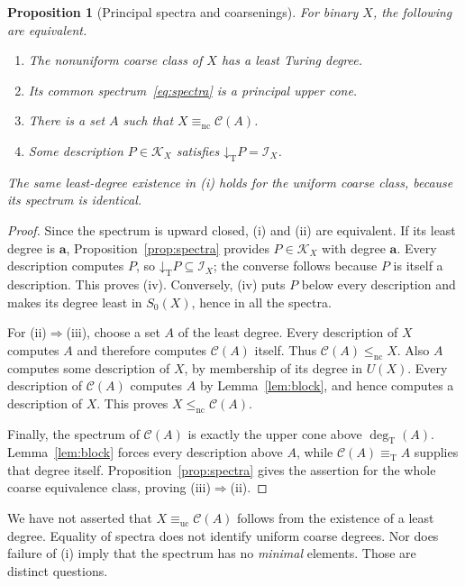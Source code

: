 \documentclass[11pt,a4paper]{article}
\newcommand{\eqT}{\equiv_{\mathrm T}}
\newcommand{\lenc}{\leq_{\mathrm{nc}}}
\newcommand{\eqnc}{\equiv_{\mathrm{nc}}}
\newcommand{\equc}{\equiv_{\mathrm{uc}}}
\newcommand{\degT}{\operatorname{deg}_{\mathrm T}}
\newcommand{\Core}{\mathcal I}
\newcommand{\low}[1]{\mathord{\downarrow}_{\mathrm T}#1}
\newtheorem{proposition}[theorem]{Proposition}
\theoremstyle{definition}\newtheorem{definition}[theorem]{Definition}
\theoremstyle{remark}\newtheorem{remark}[theorem]{Remark}
\begin{document}
\begin{proposition}[Principal spectra and coarsenings]\label{prop:criterion}
For binary $X$, the following are equivalent.
\begin{enumerate}[label=(\roman*)]
\item The nonuniform coarse class of $X$ has a least Turing degree.
\item Its common spectrum~\eqref{eq:spectra} is a principal upper cone.
\item There is a set $A$ such that $X\eqnc\mathcal C(A)$.
\item Some description $P\in\mathcal K_X$ satisfies $\low P=\Core_X$.
\end{enumerate}
The same least-degree existence in (i) holds for the uniform coarse class, because its spectrum is identical.
\end{proposition}
\begin{proof}
Since the spectrum is upward closed, (i) and (ii) are equivalent. If its least degree is $\mathbf a$, Proposition~\ref{prop:spectra} provides $P\in\mathcal K_X$ with degree $\mathbf a$. Every description computes $P$, so $\low P\subseteq\Core_X$; the converse follows because $P$ is itself a description. This proves (iv). Conversely, (iv) puts $P$ below every description and makes its degree least in $S_0(X)$, hence in all the spectra.

For (ii)$\Rightarrow$(iii), choose a set $A$ of the least degree. Every description of $X$ computes $A$ and therefore computes $\mathcal C(A)$ itself. Thus $\mathcal C(A)\lenc X$. Also $A$ computes some description of $X$, by membership of its degree in $U(X)$. Every description of $\mathcal C(A)$ computes $A$ by Lemma~\ref{lem:block}, and hence computes a description of $X$. This proves $X\lenc\mathcal C(A)$.

Finally, the spectrum of $\mathcal C(A)$ is exactly the upper cone above $\degT(A)$. Lemma~\ref{lem:block} forces every description above $A$, while $\mathcal C(A)\eqT A$ supplies that degree itself. Proposition~\ref{prop:spectra} gives the assertion for the whole coarse equivalence class, proving (iii)$\Rightarrow$(ii).
\end{proof}

We have not asserted that $X\equc\mathcal C(A)$ follows from the existence of a least degree. Equality of spectra does not identify uniform coarse degrees. Nor does failure of (i) imply that the spectrum has no \emph{minimal} elements. Those are distinct questions.
\end{document}
